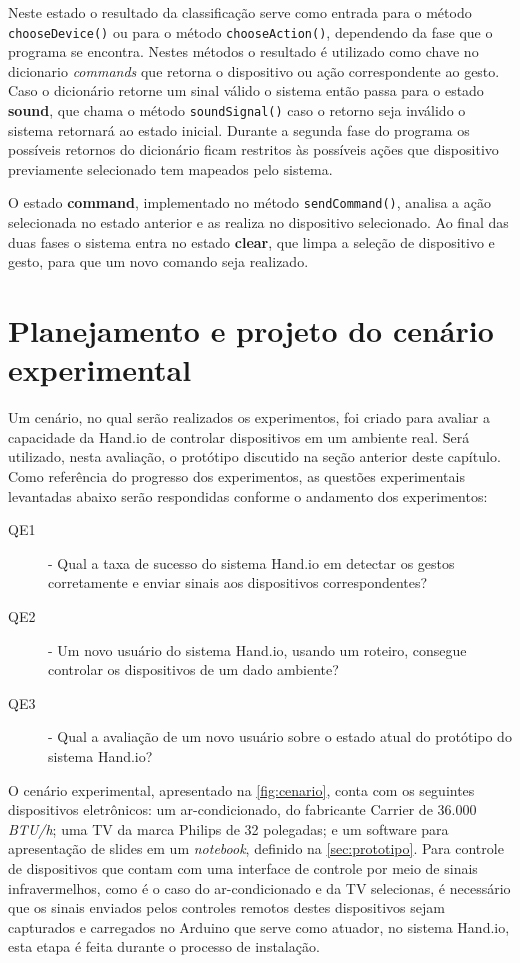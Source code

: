 Neste estado o resultado da classificação serve como entrada para o método \texttt{chooseDevice()} ou para o método \texttt{chooseAction()}, dependendo da fase que o programa se encontra. Nestes métodos o resultado é utilizado como chave no dicionario \textit{commands} que retorna o dispositivo ou ação correspondente ao gesto. 
Caso o dicionário retorne um sinal válido o sistema então passa para o estado \textbf{sound}, que chama o método \texttt{soundSignal()} caso o retorno seja inválido o sistema retornará ao estado inicial. Durante a segunda fase do programa os possíveis retornos do dicionário ficam restritos às possíveis ações que dispositivo previamente selecionado tem mapeados pelo sistema. 

O estado \textbf{command}, implementado no método \texttt{sendCommand()}, analisa a ação selecionada no estado anterior e as realiza no dispositivo selecionado. Ao final das duas fases o sistema entra no estado \textbf{clear}, que limpa a seleção de dispositivo e gesto, para que um novo comando seja realizado. 

\section{Planejamento e projeto do cenário experimental}

Um cenário, no qual serão realizados os experimentos, foi criado para avaliar a capacidade da Hand.io de controlar dispositivos em um ambiente real. Será utilizado, nesta avaliação, o protótipo discutido na seção anterior deste capítulo. Como referência do progresso dos experimentos, as questões experimentais levantadas abaixo serão respondidas conforme o andamento dos experimentos:

\begin{description}
    \item [QE1] \label{qa:1} - Qual a taxa de sucesso do sistema Hand.io em detectar os gestos corretamente e enviar sinais aos dispositivos correspondentes?
    \item [QE2] \label{qa:2} - Um novo usuário do sistema Hand.io, usando um roteiro, consegue controlar os dispositivos de um dado ambiente?
    \item [QE3] \label{qa:3} - Qual a avaliação de um novo usuário sobre o estado atual do protótipo do sistema Hand.io?
\end{description}

O cenário experimental, apresentado na \autoref{fig:cenario}, conta com os seguintes dispositivos eletrônicos: um ar-condicionado, do fabricante Carrier de 36.000 \textit{BTU/h}; uma TV da marca Philips de 32 polegadas; e um software para apresentação de slides em um \textit{notebook}, definido na \autoref{sec:prototipo}. 
Para controle de dispositivos que contam com uma interface de controle por meio de sinais infravermelhos, como é o caso do ar-condicionado e da TV selecionas, é necessário que os sinais enviados pelos controles remotos destes dispositivos sejam capturados e carregados no Arduino que serve como atuador, no sistema Hand.io, esta etapa é feita durante o processo de instalação. 

